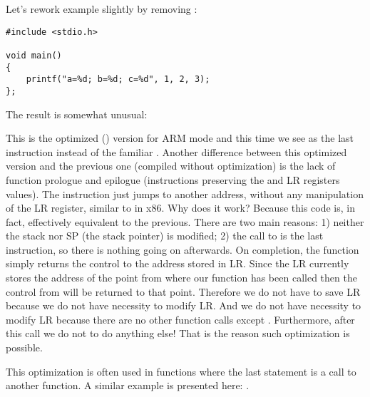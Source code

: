 \label{ARM_B_to_printf}

Let's rework example slightly by removing :

\begin{lstlisting}[style=customc]
#include <stdio.h>

void main()
{
	printf("a=%d; b=%d; c=%d", 1, 2, 3);
};
\end{lstlisting}

The result is somewhat unusual:



This is the optimized (\Othree) version for ARM mode and this time we see  as the last instruction instead of the familiar .
Another difference between this optimized version and the previous one (compiled without optimization)
is the lack of function prologue and epilogue (instructions preserving the  and \ac{LR} registers values).
The  instruction just jumps to another address, without any manipulation of the \ac{LR} register,
similar to \JMP in x86.
Why does it work? Because this code is, in fact, effectively equivalent to the previous.
There are two main reasons: 1) neither the stack nor \ac{SP} (the \gls{stack pointer}) is modified;
2) the call to \printf is the last instruction, so there is nothing going on afterwards.
On completion, the \printf function simply returns the control to the address 
stored in \ac{LR}.
Since the \ac{LR} currently stores the address of the point from where our function
has been called then the control from \printf will be returned to that point.
Therefore we do not have to save \ac{LR} because we do not have necessity to modify \ac{LR}.
And we do not have necessity to modify \ac{LR} because there are no other function calls except \printf. Furthermore,
after this call we do not to do anything else!
That is the reason such optimization is possible.

This optimization is often used in functions where the last statement is a call to another function.
A similar example is presented here:
.



